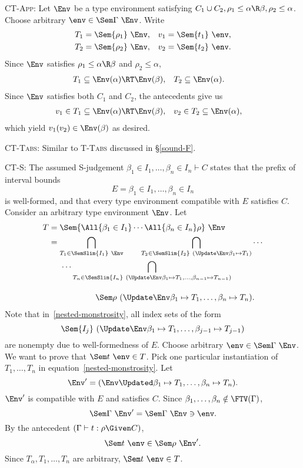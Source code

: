 \documentclass{amsart}
\theoremstyle{definition}
\begin{document}
\textsc{CT-App}: Let $\Env$ be a type environment satisfying
$C_1\cup C_2,\rho_1\le\alpha\R\beta,\rho_2\le\alpha$. Choose
arbitrary $\env\in\Sem\Gamma~\Env$. Write
\begin{align*}
T_1&=\Sem{\rho_1}~\Env,&
v_1&=\Sem{t_1}~\env,\\
T_2&=\Sem{\rho_2}~\Env,&
v_2&=\Sem{t_2}~\env.
\end{align*}
Since $\Env$ satisfies $\rho_1\le\alpha\R\beta$ and
$\rho_2\le\alpha$,
\begin{align*}
T_1&\subseteq \Env(\alpha)\RT\Env(\beta), &
T_2&\subseteq \Env(\alpha).
\end{align*}
Since $\Env$ satisfies both $C_1$ and $C_2$, the antecedents give
us
\begin{align*}
v_1&\in T_1 \subseteq \Env(\alpha)\RT\Env(\beta), &
v_2&\in T_2 \subseteq \Env(\alpha),
\end{align*}
which yield $v_1(v_2)\in\Env(\beta)$ as desired.

\textsc{CT-Tabs}: Similar to \textsc{T-Tabs} discussed in
\S\ref{sound-F}.

\textsc{CT-S}: The assumed S-judgement $\beta_1\in
I_1,\ldots,\beta_n\in I_n\vdash C$ states that the prefix of
interval bounds
\[
E=\beta_1\in I_1,\ldots,\beta_n\in I_n
\]
is well-formed, and that every type environment compatible with
$E$ satisfies $C$. Consider an arbitrary type environment
$\Env$. Let
\begin{align}
\notag
T&=\Sem{\All{\beta_1\in I_1}\cdots\All{\beta_n\in I_n}\rho}~\Env\\
&=
\bigcap_{T_1\in\SemSlim{I_1}~\Env}
\qquad
\bigcap_{T_2\in\SemSlim{I_2}~(\Update\Env\beta_1\mapsto T_1)}
\cdots
\notag\\
&\hspace{0.5cm}\cdots
\bigcap_{T_n\in\SemSlim{I_n}~(\Update\Env
\beta_1\mapsto T_1,\ldots,
\beta_{n-1}\mapsto T_{n-1}
)}
\label{nested-monstrosity}
\\[1em]
&\hspace{2cm}
\Sem\rho~(\Update\Env
\beta_1\mapsto T_1,\ldots,\beta_n\mapsto T_n).
\notag
\end{align}
Note that in~\eqref{nested-monstrosity}, all index sets of the
form
\[
\Sem{I_j}~(\Update\Env\beta_1\mapsto T_1,\ldots,
\beta_{j-1}\mapsto T_{j-1})
\]
are nonempty due to well-formedness of $E$. Choose arbitrary
$\env \in \Sem\Gamma~\Env$. We want to prove that $\Sem
t~\env \in T$. Pick one particular instantiation of
$T_1,\ldots,T_n$ in equation~\eqref{nested-monstrosity}.
Let
\[
\Env'=(\Env\Updated\beta_1\mapsto T_1,\ldots,\beta_n\mapsto T_n).
\]
$\Env'$ is compatible with $E$ and satisfies $C$. Since
$\beta_1,\ldots,\beta_n\notin\FTV(\Gamma)$,
\[
\Sem\Gamma~\Env'=\Sem\Gamma~\Env\ni\env.
\]
By the antecedent $(\Gamma\vdash t:\rho\Given C)$,
\[
\Sem t~\env\in\Sem\rho~\Env'.
\]
Since $T_\alpha,T_1,\ldots,T_n$ are arbitrary, $\Sem t~\env\in T$.
\end{document}
